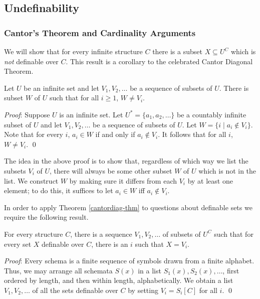 \subsection{Undefinability}
\subsubsection*{Cantor's Theorem and Cardinality Arguments}
We will show that for every infinite structure $C$ there is a subset $X\subseteq U^C$ which is \emph{not} definable over $C$. This result is a corollary to the celebrated Cantor Diagonal Theorem.
\begin{theorem}[Cantor]\label{cantordiag-thm}
Let $U$ be an infinite set and let $V_1, V_2, \ldots$ be a sequence of subsets of $U$. There is subset $W$ of $U$ such that for all $i\geq 1$, $W\neq V_i$.
\end{theorem}
\emph{Proof}: Suppose $U$ is an infinite set. Let $U^*= \{a_1, a_2, \ldots\}$ be a countably infinite subset of $U$ and let $V_1, V_2, \ldots$ be a sequence of subsets of $U$. Let $W=\{i\mid a_i\not\in V_i\}$. Note that for every $i$, $a_i\in W$ if and only if $a_i\not\in V_i$. It follows that for all $i$, $W\neq V_i$. \qed

\begin{aside}
    The idea in the above proof is to show that, regardless of which way we list the subsets $V_i$ of $U$, there will always be some other subset $W$ of $U$ which is not in the list. We construct $W$ by making sure it differs from each $V_i$ by at least one element; to do this, it suffices to let $a_i \in W$ iff $a_i \not \in V_i$. 
\end{aside}

In order to apply Theorem \ref{cantordiag-thm} to questions about definable sets we require the following result.
\begin{theorem}\label{countschema-thm}
For every structure $C$, there is a sequence $V_1,V_2,\ldots$ of subsets of $U^C$ such that for every set $X$ definable over $C$, there is an $i$ such that $X=V_i$. 

\end{theorem}
\emph{Proof}: Every schema is a finite sequence of symbols drawn from a finite alphabet. Thus, we may arrange all schemata $S(x)$ in a list $S_1(x), S_2(x),\ldots$, first ordered by length, and then within length, alphabetically. We obtain a list $V_1,V_2,\ldots $ of all the sets definable over $C$ by setting $V_i=S_i[C]$ for all $i$. \qed

